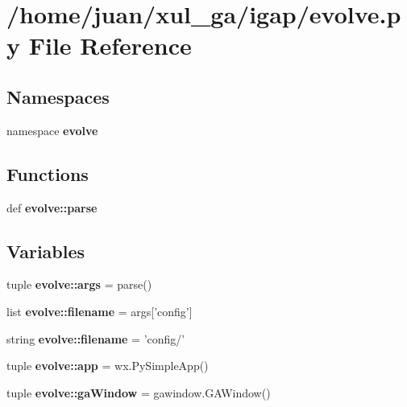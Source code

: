 \section{/home/juan/xul\_\-ga/igap/evolve.py File Reference}
\label{evolve_8py}
\subsection*{Namespaces}
\begin{CompactItemize}
\item 
namespace {\bf evolve}
\end{CompactItemize}
\subsection*{Functions}
\begin{CompactItemize}
\item 
def {\bf evolve::parse}
\end{CompactItemize}
\subsection*{Variables}
\begin{CompactItemize}
\item 
tuple {\bf evolve::args} = parse()
\item 
list {\bf evolve::filename} = args['config']
\item 
string {\bf evolve::filename} = 'config/'
\item 
tuple {\bf evolve::app} = wx.PySimpleApp()
\item 
tuple {\bf evolve::gaWindow} = gawindow.GAWindow()
\end{CompactItemize}
